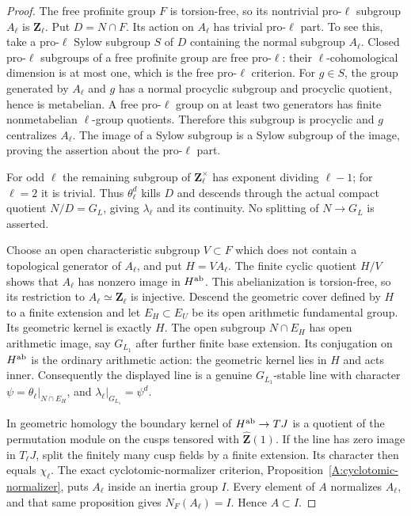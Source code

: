 \begin{proof}
The free profinite group $F$ is torsion-free, so its
nontrivial pro-$\ell$ subgroup $A_\ell$ is
$\mathbf Z_\ell$. Put $D=N\cap F$. Its action on
$A_\ell$ has trivial pro-$\ell$ part. To see this,
take a pro-$\ell$ Sylow subgroup $S$ of $D$ containing
the normal subgroup $A_\ell$. Closed pro-$\ell$
subgroups of a free profinite group are free pro-$\ell$:
their $\ell$-cohomological dimension is at most one,
which is the free pro-$\ell$ criterion. For $g\in S$,
the group generated by $A_\ell$ and $g$ has a normal
procyclic subgroup and procyclic quotient, hence is
metabelian. A free pro-$\ell$ group on at least two
generators has finite nonmetabelian $\ell$-group
quotients. Therefore this subgroup is procyclic and
$g$ centralizes $A_\ell$. The image of a Sylow
subgroup is a Sylow subgroup of the image, proving
the assertion about the pro-$\ell$ part.

For odd $\ell$ the remaining subgroup of
$\mathbf Z_\ell^\times$ has exponent dividing
$\ell-1$; for $\ell=2$ it is trivial. Thus
$\theta_\ell^d$ kills $D$ and descends through the
actual compact quotient $N/D=G_L$, giving
$\lambda_\ell$ and its continuity. No splitting of
$N\to G_L$ is asserted.

Choose an open characteristic subgroup $V\subset F$
which does not contain a topological generator of
$A_\ell$, and put $H=VA_\ell$. The finite cyclic
quotient $H/V$ shows that $A_\ell$ has nonzero image
in $H^{\rm ab}$. This abelianization is torsion-free,
so its restriction to $A_\ell\simeq\mathbf Z_\ell$
is injective. Descend the geometric cover defined by
$H$ to a finite extension and let $E_H\subset E_U$
be its open arithmetic fundamental group. Its
geometric kernel is exactly $H$. The open subgroup
$N\cap E_H$ has open arithmetic image, say
$G_{L_1}$ after further finite base extension.
Its conjugation on $H^{\rm ab}$ is the ordinary
arithmetic action: the geometric kernel lies in $H$
and acts inner. Consequently the displayed line is
a genuine $G_{L_1}$-stable line with character
$\psi=\theta_\ell|_{N\cap E_H}$, and
$\lambda_\ell|_{G_{L_1}}=\psi^d$.

In geometric homology the boundary kernel of
$H^{\rm ab}\to T J$ is a quotient of the permutation
module on the cusps tensored with
$\widehat{\mathbf Z}(1)$. If the line has zero image
in $T_\ell J$, split the finitely many cusp fields
by a finite extension. Its character then equals
$\chi_\ell$. The exact cyclotomic-normalizer
criterion, Proposition~\ref{A:cyclotomic-normalizer},
puts $A_\ell$ inside an inertia group $I$.
Every element of $A$ normalizes $A_\ell$, and that
same proposition gives $N_F(A_\ell)=I$. Hence
$A\subset I$.


\end{proof}

